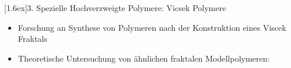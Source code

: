 \documentclass[final]{beamer}
\newlength{\columnheight}
\newlength{\marginw}
\newlength{\tw}
\newlength{\colsep}
\newlength{\colw}
\newenvironment{myTwoColPoster}{%
  \begin{minipage}[t]{\textwidth}%
    \hspace*{\marginw}%
    \hspace*{9.5bp}%
    \begin{minipage}[t]{\tw}}%
  {\end{minipage}%
   \hspace*{\marginw}%
   \end{minipage}}
\newenvironment{myCol}%
    {\begin{minipage}[t][\columnheight][t]{\colw}}%
    {\end{minipage}}
\newenvironment{textblock}[1]%
    {\begin{block}{\rule[-0.6ex]{0pt}{2.4ex}\raisebox{-0.25ex}[1.6ex]{#1}}%
     \vspace*{5mm}}%
    {\vspace*{5mm}\end{block}}
\begin{document}
\begin{frame}[t]{}
\begin{myTwoColPoster}
\begin{myCol}
\end{myCol}
\hfill
\begin{myCol}
  
  \begin{textblock}{3. Spezielle Hochverzweigte Polymere: Vicsek Polymere \cite{Werner2011}}
    \begin{itemize}\setlength\itemsep{1.4em}\large
      \item Forschung an Synthese von Polymeren nach der Konstruktion eines Viscek Fraktals
      \item Theoretische Untersuchung von ähnlichen fraktalen Modellpolymeren: 
      \printbibliography
    \end{itemize}
  \end{textblock}


\end{myCol}
\end{myTwoColPoster}
\end{frame}
\end{document}
